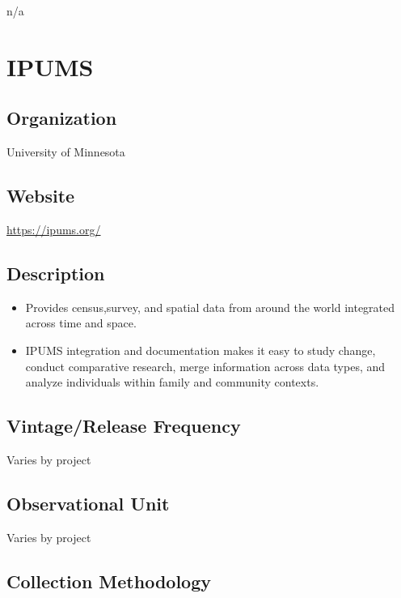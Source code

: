 \documentclass[
]{book}
\providecommand{\tightlist}{%
  \setlength{\itemsep}{0pt}\setlength{\parskip}{0pt}}
\begin{document}
n/a

\mainmatter

\hypertarget{ipums}{%
\chapter{IPUMS}\label{ipums}}

\hypertarget{organization-34}{%
\section{Organization}\label{organization-34}}

University of Minnesota

\hypertarget{website-34}{%
\section{Website}\label{website-34}}

\url{https://ipums.org/}

\hypertarget{description-34}{%
\section{Description}\label{description-34}}

\begin{itemize}
\tightlist
\item
  Provides census,survey, and spatial data from around the world integrated across time and space.
\item
  IPUMS integration and documentation makes it easy to study change, conduct comparative research, merge information across data types, and analyze individuals within family and community contexts.
\end{itemize}

\hypertarget{vintagerelease-frequency-34}{%
\section{Vintage/Release Frequency}\label{vintagerelease-frequency-34}}

Varies by project

\hypertarget{observational-unit-34}{%
\section{Observational Unit}\label{observational-unit-34}}

Varies by project

\hypertarget{collection-methodology-34}{%
\section{Collection Methodology}\label{collection-methodology-34}}
\end{document}
